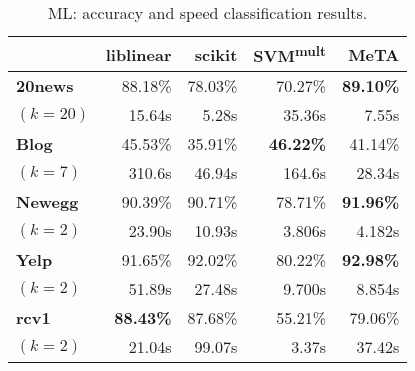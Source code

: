 \begin{table}[t]
\centering
{\small
\begin{tabular}{|l|r|r|r|r|}
  \hline
  & \textbf{liblinear} & \textbf{scikit} &
  \textbf{SVM\textsuperscript{mult}} & \textbf{MeTA}\\\hline
  \textbf{20news}                    & 88.18\%          & 78.03\%  & 70.27\%          & \textbf{89.10\%}\\
  $(k=20)$                           & 15.64s           & 5.28s    & 35.36s           & 7.55s\\\hline
  \textbf{Blog}                      & 45.53\%          & 35.91\%  & \textbf{46.22\%} & 41.14\%\\
  $(k=7)$                            & 310.6s           & 46.94s   & 164.6s           & 28.34s\\\hline
  \textbf{Newegg}                    & 90.39\%          & 90.71\%  & 78.71\%          & \textbf{91.96\%}\\
  $(k=2)$                            & 23.90s           & 10.93s   & 3.806s           & 4.182s\\\hline
  \textbf{Yelp}                      & 91.65\%          & 92.02\%  & 80.22\%          & \textbf{92.98\%}\\
  $(k=2)$                            & 51.89s           & 27.48s   & 9.700s           & 8.854s\\\hline
  \textbf{rcv1}                      & \textbf{88.43\%} & 87.68\%  & 55.21\%          & 79.06\%\\
  $(k=2)$                            & 21.04s           & 99.07s   & 3.37s            & 37.42s\\\hline
\end{tabular}
}
\caption{ML: accuracy and speed classification results.}
\label{table:ml-exp}
\end{table}
